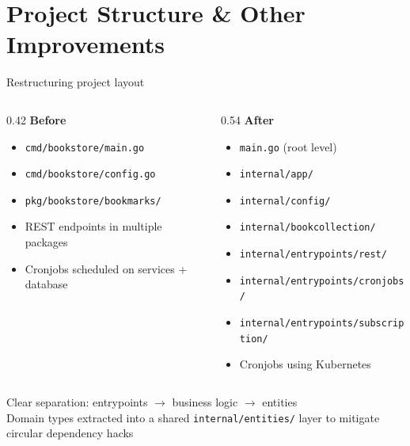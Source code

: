\documentclass[aspectratio=169,11pt]{beamer}
\begin{document}
\section{Project Structure \& Other Improvements}

\begin{frame}{Restructuring project layout}
  \begin{columns}[T]
    \begin{column}{0.42\textwidth}
      \textbf{Before}\vspace{2pt}
      \begin{itemize}\scriptsize\setlength\itemsep{1pt}
        \item \texttt{cmd/bookstore/main.go}
        \item \texttt{cmd/bookstore/config.go}
        \item \texttt{pkg/bookstore/bookmarks/}
        \item REST endpoints in multiple packages
        \item Cronjobs scheduled on services + database
      \end{itemize}
    \end{column}
    \begin{column}{0.54\textwidth}
      \textbf{After}\vspace{2pt}
      \begin{itemize}\scriptsize\setlength\itemsep{1pt}
        \item \texttt{main.go} (root level)
        \item \texttt{internal/app/}
        \item \texttt{internal/config/}
        \item \texttt{internal/bookcollection/}
        \item \texttt{internal/entrypoints/rest/}
        \item \texttt{internal/entrypoints/cronjobs/}
        \item \texttt{internal/entrypoints/subscription/}
        \item Cronjobs using Kubernetes
      \end{itemize}
    \end{column}
  \end{columns}

  \vspace{4pt}
  \centering
  {\small Clear separation: entrypoints \(\rightarrow\) business logic \(\rightarrow\) entities}\\[2pt]
  {\small Domain types extracted into a shared \texttt{internal/entities/} layer to mitigate circular dependency hacks}
\end{frame}
\end{document}
